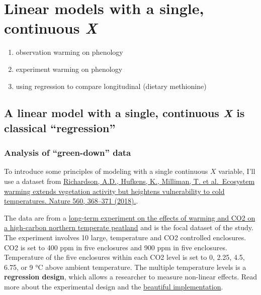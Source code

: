 \documentclass[]{book}
\providecommand{\tightlist}{%
  \setlength{\itemsep}{0pt}\setlength{\parskip}{0pt}}
\begin{document}
\hypertarget{linear-models-with-a-single-continuous-x}{%
\chapter{\texorpdfstring{Linear models with a single, continuous \emph{X}}{Linear models with a single, continuous X}}\label{linear-models-with-a-single-continuous-x}}

\begin{enumerate}
\def\labelenumi{\arabic{enumi}.}
\tightlist
\item
  observation warming on phenology
\item
  experiment warming on phenology
\item
  using regression to compare longitudinal (dietary methionine)
\end{enumerate}

\hypertarget{a-linear-model-with-a-single-continuous-x-is-classical-regression}{%
\section{\texorpdfstring{A linear model with a single, continuous \emph{X} is classical ``regression''}{A linear model with a single, continuous X is classical ``regression''}}\label{a-linear-model-with-a-single-continuous-x-is-classical-regression}}

\hypertarget{analysis-of-green-down-data}{%
\subsection{Analysis of ``green-down'' data}\label{analysis-of-green-down-data}}

To introduce some principles of modeling with a single continuous \(X\) variable, I'll use a dataset from \href{https://doi.org/10.1038/s41586-018-0399-1}{Richardson, A.D., Hufkens, K., Milliman, T. et al.~Ecosystem warming extends vegetation activity but heightens vulnerability to cold temperatures. Nature 560, 368--371 (2018).}.

The data are from a \href{https://mnspruce.ornl.gov}{long-term experiment on the effects of warming and CO2 on a high-carbon northern temperate peatland} and is the focal dataset of the study. The experiment involves 10 large, temperature and CO2 controlled enclosures. CO2 is set to 400 ppm in five enclosures and 900 ppm in five enclosures. Temperature of the five enclosures within each CO2 level is set to 0, 2.25, 4.5, 6.75, or 9 °C above ambient temperature. The multiple temperature levels is a \textbf{regression design}, which allows a researcher to measure non-linear effects. Read more about the experimental design and the \href{https://mnspruce.ornl.gov/design}{beautiful implementation}.
\end{document}
